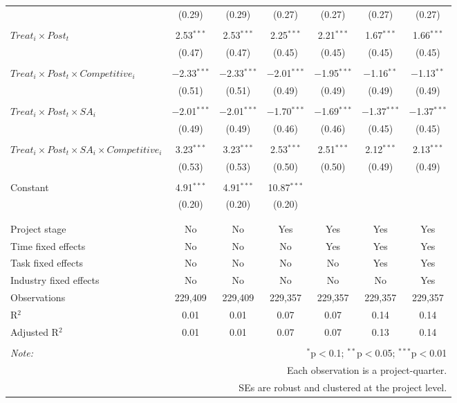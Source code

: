 \documentclass[
]{article}
\begin{document}
\begin{table}[H]
\begin{tabular}{@{\extracolsep{-3pt}}lcccccc}
  & (0.29) & (0.29) & (0.27) & (0.27) & (0.27) & (0.27) \\ 
  & & & & & & \\ 
 $Treat_i \times Post_t$ & 2.53$^{***}$ & 2.53$^{***}$ & 2.25$^{***}$ & 2.21$^{***}$ & 1.67$^{***}$ & 1.66$^{***}$ \\ 
  & (0.47) & (0.47) & (0.45) & (0.45) & (0.45) & (0.45) \\ 
  & & & & & & \\ 
 $Treat_i \times Post_t \times Competitive_i$ & $-$2.33$^{***}$ & $-$2.33$^{***}$ & $-$2.01$^{***}$ & $-$1.95$^{***}$ & $-$1.16$^{**}$ & $-$1.13$^{**}$ \\ 
  & (0.51) & (0.51) & (0.49) & (0.49) & (0.49) & (0.49) \\ 
  & & & & & & \\ 
 $Treat_i \times Post_t \times SA_i$ & $-$2.01$^{***}$ & $-$2.01$^{***}$ & $-$1.70$^{***}$ & $-$1.69$^{***}$ & $-$1.37$^{***}$ & $-$1.37$^{***}$ \\ 
  & (0.49) & (0.49) & (0.46) & (0.46) & (0.45) & (0.45) \\ 
  & & & & & & \\ 
 $Treat_i \times Post_t \times SA_i \times Competitive_i$ & 3.23$^{***}$ & 3.23$^{***}$ & 2.53$^{***}$ & 2.51$^{***}$ & 2.12$^{***}$ & 2.13$^{***}$ \\ 
  & (0.53) & (0.53) & (0.50) & (0.50) & (0.49) & (0.49) \\ 
  & & & & & & \\ 
 Constant & 4.91$^{***}$ & 4.91$^{***}$ & 10.87$^{***}$ &  &  &  \\ 
  & (0.20) & (0.20) & (0.20) &  &  &  \\ 
  & & & & & & \\ 
\hline \\[-1.8ex] 
Project stage & No & No & Yes & Yes & Yes & Yes \\ 
Time fixed effects & No & No & No & Yes & Yes & Yes \\ 
Task fixed effects & No & No & No & No & Yes & Yes \\ 
Industry fixed effects & No & No & No & No & No & Yes \\ 
Observations & 229,409 & 229,409 & 229,357 & 229,357 & 229,357 & 229,357 \\ 
R$^{2}$ & 0.01 & 0.01 & 0.07 & 0.07 & 0.14 & 0.14 \\ 
Adjusted R$^{2}$ & 0.01 & 0.01 & 0.07 & 0.07 & 0.13 & 0.14 \\ 
\hline 
\hline \\[-1.8ex] 
\textit{Note:}  & \multicolumn{6}{r}{$^{*}$p$<$0.1; $^{**}$p$<$0.05; $^{***}$p$<$0.01} \\ 
 & \multicolumn{6}{r}{Each observation is a project-quarter.} \\ 
 & \multicolumn{6}{r}{SEs are robust and clustered at the project level.} \\ 
\end{tabular} 
\end{table}
\end{document}
